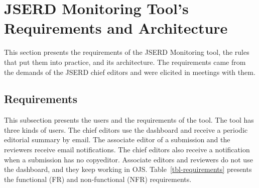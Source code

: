 \documentclass[12pt]{article}
\begin{document}
\section{JSERD Monitoring Tool's Requirements and Architecture}
\label{sec-requirements}

This section presents the requirements of the JSERD Monitoring tool, the
rules that put them into practice, and its architecture. The requirements
came from the demands of the JSERD chief editors and were elicited in
meetings with them.

\subsection{Requirements}
\label{sec-requirements-list}

This subsection presents the users and the requirements of the tool. The
tool has three kinds of users. The chief editors use the dashboard and
receive a periodic editorial summary by email. The associate editor of a
submission and the reviewers receive email notifications. The chief editors
also receive a notification when a submission has no copyeditor. Associate
editors and reviewers do not use the dashboard, and they keep working in OJS.
Table~\ref{tbl-requirements} presents the functional (FR) and
non-functional (NFR) requirements.
\end{document}
